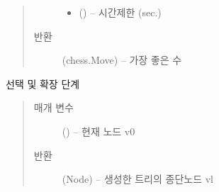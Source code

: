 \documentclass[letterpaper,10pt,english]{sphinxmanual}
\begin{document}
\begin{fulllineitems}
\begin{fulllineitems}
\begin{quote}
\begin{description}
\begin{itemize}
\item {} 
 () -- 시간제한 (sec.)

\end{itemize}

\item[{반환}] \leavevmode
(chess.Move) -- 가장 좋은 수

\end{description}\end{quote}

\end{fulllineitems}


\begin{fulllineitems}
\label{\detokenize{agents.self_learning:agents.self_learning.mcts.MCTSPlanner.tree_policy}}
선택 및 확장 단계
\begin{quote}\begin{description}
\item[{매개 변수}] \leavevmode
{} ({\hyperref[\detokenize{agents.self_learning:agents.self_learning.mcts.Node}]{}}) -- 현재 노드 v0

\item[{반환}] \leavevmode
(Node) -- 생성한 트리의 종단노드 vl

\end{description}\end{quote}

\end{fulllineitems}


\end{fulllineitems}

\end{document}
